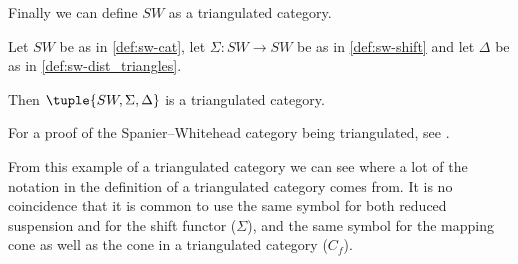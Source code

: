 Finally we can define \( SW \) as a triangulated category.

\begin{example}
    Let \( SW \) be as in \autoref{def:sw-cat}, let \( \Sigma: SW \to SW \) be as in \autoref{def:sw-shift} and let \( \Delta \) be as in \autoref{def:sw-dist_triangles}.

    Then \( \tuple{SW, \Sigma, \Delta} \) is a triangulated category.
\end{example}

For a proof of the Spanier--Whitehead category being triangulated, see \cite[Theorem 5.9]{Daria_Bachelor}.

From this example of a triangulated category we can see where a lot of the notation in the definition of a triangulated category comes from. It is no coincidence that it is common to use the same symbol for both reduced suspension and for the shift functor (\( \Sigma \)), and the same symbol for the mapping cone as well as the cone in a triangulated category (\( C_f \)).
